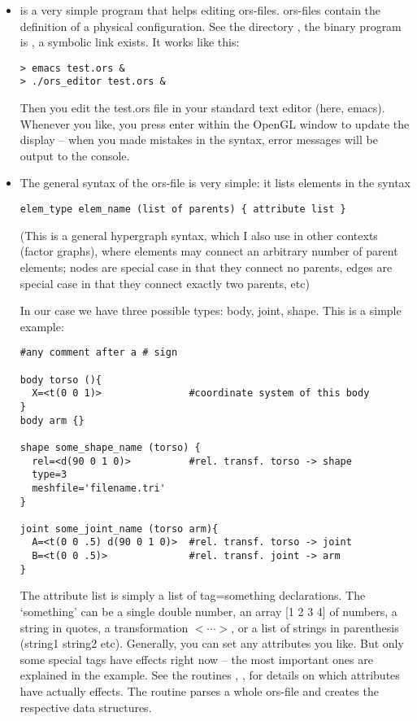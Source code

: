 \begin{itemize}
\item {} is a very simple program that helps editing
   ors-files. ors-files contain the definition of a physical
   configuration. See the directory , the binary
   program is , a symbolic link 
   exists. It works like this:
\begin{lstlisting}
> emacs test.ors &
> ./ors_editor test.ors &
\end{lstlisting}
Then you edit the test.ors file in your standard text editor (here,
emacs). Whenever you like, you press enter within the OpenGL window to
update the display -- when you made mistakes in the syntax, error
messages will be output to the console.

\item The general syntax of the ors-file is very simple: it lists elements
in the syntax
\begin{lstlisting}
elem_type elem_name (list of parents) { attribute list }
\end{lstlisting}
(This is a general hypergraph syntax, which I also use in other
contexts (factor graphs), where elements may connect an arbitrary
number of parent elements; nodes are special case in that they connect no
parents, edges are special case in that they connect exactly two
parents, etc)

In our case we have three possible types: body, joint, shape. This is
a simple example:
\begin{lstlisting}
#any comment after a # sign

body torso (){
  X=<t(0 0 1)>               #coordinate system of this body
}
body arm {}

shape some_shape_name (torso) {
  rel=<d(90 0 1 0)>          #rel. transf. torso -> shape
  type=3
  meshfile='filename.tri'
}

joint some_joint_name (torso arm){
  A=<t(0 0 .5) d(90 0 1 0)>  #rel. transf. torso -> joint
  B=<t(0 0 .5)>              #rel. transf. joint -> arm
}
\end{lstlisting}

The attribute list is simply a list of tag=something declarations. The
`something' can be a single double number, an array [1 2 3 4] of
numbers, a string in quotes, a transformation $<\cdots>$, or a list of
strings in parenthesis (string1 string2 etc). Generally, you can set
any attributes you like. But only some special tags have effects right
now -- the most important ones are explained in the example. See the
routines , , 
for details on which attributes have actually effects. The
routine  parses a whole ors-file and creates
the respective data structures.


\end{itemize}

